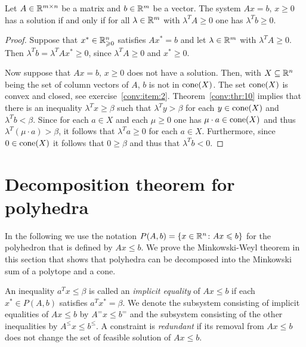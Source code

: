 \begin{theorem}
  \label{conv:thr:12}
  Let $A \in \mathbb{R}^{m\times n}$ be a matrix and $b \in \mathbb{R}^m$ be a vector. The
  system $Ax = b, \,x\geq0$ has a solution if and only if for all $\lambda \in
  \mathbb{R}^m$ with $\lambda^TA\geq0$ one has $\lambda^Tb \geq0$.  
\end{theorem}

\begin{proof}
  Suppose that $x^* \in \mathbb{R}^n_{\geqslant0}$ satisfies $Ax^* = b$ and let $\lambda \in
  \mathbb{R}^m$ with $\lambda^T A \geq0$. Then $\lambda^Tb = \lambda^TA x^* \geq0$, since
  $\lambda^TA\geq0$ and $x^*\geq0$. 

  Now suppose that $Ax = b, \,x\geq0$ does not have a solution. Then,
  with   $X\subseteq\mathbb{R}^n$ being  the set of column vectors of $A$, 
  $b$ is not in $\mathrm{cone}(X)$. The set $\mathrm{cone}(X)$ is convex and
  closed, see exercise~\ref{conv:item:2}. Theorem~\ref{conv:thr:10} implies 
  that there is an inequality $\lambda^Tx \geq \beta$ such that $\lambda^Ty > \beta$ for
  each $y \in \mathrm{cone}(X)$ and $\lambda^Tb < \beta$. Since for each $a \in X$ and
  each $\mu\geq0$ one has $\mu\cdot a \in \mathrm{cone}(X)$  and thus  $\lambda^T (\mu\cdot a)
  >\beta$, it follows that $\lambda^T a \geq0$ for each $a \in X$. Furthermore,
  since $0 \in \mathrm{cone}(X)$ it follows that $0\geq\beta$ and thus that
  $\lambda^Tb<0$. 
  
\end{proof}

\section{Decomposition theorem for polyhedra}
\label{sec:decomp-theor-polyh}

In the following we use the notation $P(A,b) = \{x \in\mathbb{R}^n \colon Ax \leqslant b\}$ for the polyhedron that is defined by $Ax \leq b$. We prove the Minkowski-Weyl theorem in this section that shows that polyhedra can be decomposed into the Minkowski sum of a polytope and a cone. 

\begin{definition}
\label{po:def:5}
An inequality $a^Tx\leq\beta$ is called an \emph{implicit equality} of
$Ax\leq b$ if each $x^* \in P(A,b)$ satisfies $a^Tx^* = \beta$. We denote the
subsystem  consisting of implicit equalities of $Ax\leq b$ by $A^=x\leq b^=$
and the subsystem consisting of the other inequalities by
$A^\leq x\leq b^\leq$. A constraint is \emph{redundant} if its removal from
$Ax\leq b$ does not change the set of feasible solution of $Ax\leq b$.  
\end{definition}

